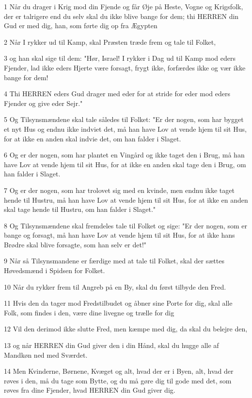 \par 1 Når du drager i Krig mod din Fjende og får Øje på Heste, Vogne og Krigsfolk, der er talrigere end du selv skal du ikke blive bange for dem; thi HERREN din Gud er med dig, han, som førte dig op fra Ægypten
\par 2 Når I rykker ud til Kamp, skal Præsten træde frem og tale til Folket,
\par 3 og han skal sige til dem: "Hør, Israel! I rykker i Dag ud til Kamp mod eders Fjender, lad ikke eders Hjerte være forsagt, frygt ikke, forfærdes ikke og vær ikke bange for dem!
\par 4 Thi HERREN eders Gud drager med eder for at stride for eder mod eders Fjender og give eder Sejr."
\par 5 Og Tilsynsmændene skal tale således til Folket: "Er der nogen, som har bygget et nyt Hus og endnu ikke indviet det, må han have Lov at vende hjem til sit Hus, for at ikke en anden skal indvie det, om han falder i Slaget.
\par 6 Og er der nogen, som har plantet en Vingård og ikke taget den i Brug, må han have Lov at vende hjem til sit Hus, for at ikke en anden skal tage den i Brug, om han falder i Slaget.
\par 7 Og er der nogen, som har trolovet sig med en kvinde, men endnu ikke taget hende til Hustru, må han have Lov at vende hjem til sit Hus, for at ikke en anden skal tage hende til Hustru, om han falder i Slaget."
\par 8 Og Tilsynsmændene skal fremdeles tale til Folket og sige: "Er der nogen, som er bange og forsagt, må han have Lov at vende hjem til sit Hus, for at ikke hans Brødre skal blive forsagte, som han selv er det!"
\par 9 Når så Tilsynsmandene er færdige med at tale til Folket, skal der sættes Høvedsmænd i Spidsen for Folket.
\par 10 Når du rykker frem til Angreb på en By, skal du først tilbyde den Fred.
\par 11 Hvis den da tager mod Fredstilbudet og åbner sine Porte for dig, skal alle Folk, som findes i den, være dine livegne og trælle for dig
\par 12 Vil den derimod ikke slutte Fred, men kæmpe med dig, da skal du belejre den,
\par 13 og når HERREN din Gud giver den i din Hånd, skal du hugge alle af Mandkøn ned med Sværdet.
\par 14 Men Kvinderne, Børnene, Kvæget og alt, hvad der er i Byen, alt, hvad der røves i den, må du tage som Bytte, og du må gøre dig til gode med det, som røves fra dine Fjender, hvad HERREN din Gud giver dig.
